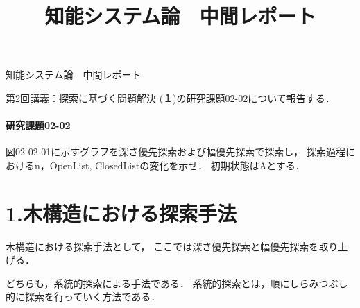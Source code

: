 \documentclass[12pt,dvipdfmx]{jarticle}
\title{知能システム論　中間レポート}
\begin{document}
{\LARGE 知能システム論　中間レポート}
\begin{flushright}

\end{flushright}

\vspace{12pt}
第2回講義：探索に基づく問題解決 (１)の研究課題02-02について報告する．
\vspace{-0.5cm}
\paragraph*{研究課題02-02}
図02-02-01に示すグラフを深さ優先探索および幅優先探索で探索し， 探索過程におけるn，OpenList, ClosedListの変化を示せ． 初期状態はAとする．

\vspace{-1cm}
\section*{1.木構造における探索手法}

木構造における探索手法として，
ここでは深さ優先探索と幅優先探索を取り上げる．

どちらも，系統的探索による手法である．
系統的探索とは，順にしらみつぶし的に探索を行っていく方法である．
\end{document}
